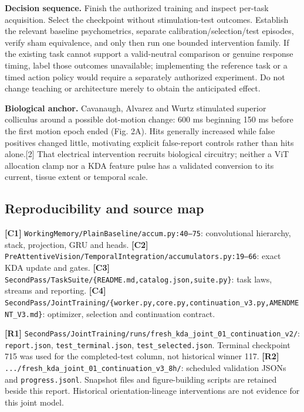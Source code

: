 \documentclass[
  10pt,
]{article}
\begin{document}
\textbf{Decision sequence.} Finish the authorized training and inspect
per-task acquisition. Select the checkpoint without stimulation-test
outcomes. Establish the relevant baseline psychometrics, separate
calibration/selection/test episodes, verify sham equivalence, and only
then run one bounded intervention family. If the existing task cannot
support a valid-neutral comparison or genuine response timing, label
those outcomes unavailable; implementing the reference task or a timed
action policy would require a separately authorized experiment. Do not
change teaching or architecture merely to obtain the anticipated effect.

\textbf{Biological anchor.} Cavanaugh, Alvarez and Wurtz stimulated
superior colliculus around a possible dot-motion change: 600 ms
beginning 150 ms before the first motion epoch ended (Fig. 2A). Hits
generally increased while false positives changed little, motivating
explicit false-report controls rather than hits alone.{[}2{]} That
electrical intervention recruits biological circuitry; neither a ViT
allocation clamp nor a KDA feature pulse has a validated conversion to
its current, tissue extent or temporal scale.

\subsection{Reproducibility and source
map}\label{reproducibility-and-source-map}

\textbf{{[}C1{]}} \texttt{WorkingMemory/PlainBaseline/accum.py:40–75}:
convolutional hierarchy, stack, projection, GRU and heads.
\textbf{{[}C2{]}}
\texttt{PreAttentiveVision/TemporalIntegration/accumulators.py:19–66}:
exact KDA update and gates. \textbf{{[}C3{]}}
\texttt{SecondPass/TaskSuite/\{README.md,catalog.json,suite.py\}}: task
laws, streams and reporting. \textbf{{[}C4{]}}
\texttt{SecondPass/JointTraining/\{worker.py,core.py,continuation\_v3.py,AMENDMENT\_V3.md\}}:
optimizer, selection and continuation contract.

\textbf{{[}R1{]}}
\texttt{SecondPass/JointTraining/runs/fresh\_kda\_joint\_01\_continuation\_v2/}:
\texttt{report.json}, \texttt{test\_terminal.json},
\texttt{test\_selected.json}. Terminal checkpoint 715 was used for the
completed-test column, not historical winner 117. \textbf{{[}R2{]}}
\texttt{.../fresh\_kda\_joint\_01\_continuation\_v3\_8h/}: scheduled
validation JSONs and \texttt{progress.jsonl}. Snapshot files and
figure-building scripts are retained beside this report. Historical
orientation-lineage interventions are not evidence for this joint model.
\end{document}
